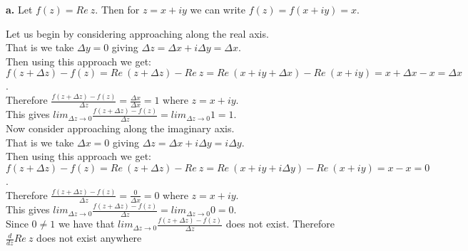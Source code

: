 \documentclass{article}
\begin{document}
{\Large\textbf{a.}} Let $f(z) = Re\:z$. Then for $z = x + iy$ we can write $f(z) = f(x + iy) = x$.
\begin{center}
    \doublespacing
    Let us begin by considering approaching along the real axis.
    \\That is we take $\Delta y = 0$ giving $\Delta z = \Delta x + i\Delta y =\Delta x$.
    \\Then using this approach we get:
    \\$f(z +\Delta z) - f(z) = Re\:(z +\Delta z) - Re\:z = Re\:(x + iy +\Delta x) - Re\:(x + iy) = x +\Delta x - x =\Delta x$.
    \\Therefore $\frac{f(z +\Delta z) - f(z)}{\Delta z} =\frac{\Delta x}{\Delta x} = 1$ where $z = x + iy$.
    \\This gives $lim _{\Delta z\rightarrow 0}\frac{f(z +\Delta z) - f(z)}{\Delta z} = lim _{\Delta z\rightarrow 0} 1 = 1$.
    \break
    \\Now consider approaching along the imaginary axis.
    \\That is we take $\Delta x = 0$ giving $\Delta z = \Delta x + i\Delta y = i\Delta y$.
    \\Then using this approach we get:
    \\$f(z +\Delta z) - f(z) = Re\:(z +\Delta z) - Re\:z = Re\:(x + iy + i\Delta y) - Re\:(x + iy) = x - x = 0$.
    \\Therefore $\frac{f(z +\Delta z) - f(z)}{\Delta z} =\frac{0}{\Delta x} = 0$ where $z = x + iy$.
    \\This gives $lim _{\Delta z\rightarrow 0}\frac{f(z +\Delta z) - f(z)}{\Delta z} = lim _{\Delta z\rightarrow 0} 0 = 0$.
    \break
    \\Since $0\neq 1$ we have that $lim _{\Delta z\rightarrow 0}\frac{f(z +\Delta z) - f(z)}{\Delta z}$ does not exist. Therefore $\frac{d}{dz} Re\:z$ does not exist anywhere \qedsymbol
\end{center}
\end{document}
